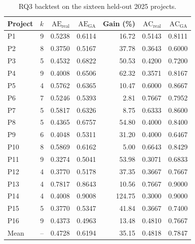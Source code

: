 \documentclass[conference]{IEEEtran}
\begin{document}
\begin{table}[!t]
\centering
\footnotesize
\setlength{\tabcolsep}{4pt}
\caption{RQ3 backtest on the sixteen held-out 2025 projects.}
\label{tab:rq3-backtest}
\begin{tabular}{lrrrrrr}
\hline
Project & $k$ & $\mathrm{AE}_{\mathrm{real}}$ & $\mathrm{AE}_{\mathrm{GA}}$ & Gain (\%) & $\mathrm{AC}_{\mathrm{real}}$ & $\mathrm{AC}_{\mathrm{GA}}$ \\
\hline
P1  & 9 & 0.5238 & 0.6114 & 16.72 & 0.5143 & 0.8111 \\
P2  & 8 & 0.3750 & 0.5167 & 37.78 & 0.3643 & 0.6000 \\
P3  & 5 & 0.4532 & 0.6822 & 50.53 & 0.4200 & 0.7200 \\
P4  & 9 & 0.4008 & 0.6506 & 62.32 & 0.3571 & 0.8167 \\
P5  & 4 & 0.5762 & 0.6365 & 10.47 & 0.6000 & 0.8667 \\
P6  & 7 & 0.5246 & 0.5393 & 2.81  & 0.7667 & 0.7952 \\
P7  & 5 & 0.5817 & 0.6326 & 8.75  & 0.6333 & 0.8600 \\
P8  & 5 & 0.4365 & 0.6757 & 54.80 & 0.4000 & 0.8400 \\
P9  & 6 & 0.4048 & 0.5311 & 31.20 & 0.4000 & 0.6467 \\
P10 & 8 & 0.5869 & 0.6162 & 5.00  & 0.6643 & 0.8429 \\
P11 & 9 & 0.3274 & 0.5041 & 53.98 & 0.3071 & 0.6833 \\
P12 & 4 & 0.3770 & 0.5178 & 37.35 & 0.3667 & 0.7667 \\
P13 & 4 & 0.7817 & 0.8643 & 10.56 & 0.7667 & 0.9000 \\
P14 & 4 & 0.4008 & 0.9008 & 124.75 & 0.3000 & 0.9000 \\
P15 & 5 & 0.3770 & 0.5347 & 41.84 & 0.3667 & 0.7400 \\
P16 & 9 & 0.4373 & 0.4963 & 13.48 & 0.4810 & 0.7667 \\
\hline
Mean & -- & 0.4728 & 0.6194 & 35.15 & 0.4818 & 0.7847 \\
\hline
\end{tabular}
\end{table}

\FloatBarrier
\clearpage
\end{document}
